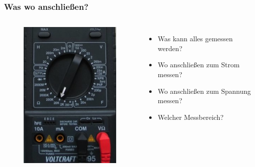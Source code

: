 \begin{frame}
  \frametitle{Was wo anschließen?}
  \begin{columns}
    \begin{center}
      \begin{figure}
        \includegraphics[width=\textwidth,height=.7\textheight,keepaspectratio]{a16/digitalmultimeterMess.jpg}
      \end{figure}
    \end{center}
    \begin{itemize}
      \item Was kann alles gemessen werden?
      \item Wo anschließen zum Strom messen?
      \item Wo anschließen zum Spannung messen?
      \item Welcher Messbereich?
    \end{itemize}
  \end{columns}
\end{frame}

